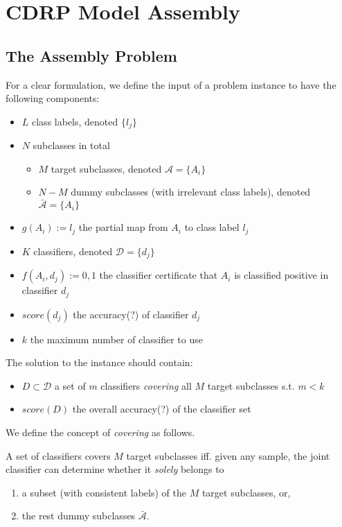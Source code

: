 \documentclass[sigplan,10pt,review]{acmart}\settopmatter{printfolios=true,printccs=false,printacmref=false}
\begin{document}
\section{CDRP Model Assembly}
\subsection{The Assembly Problem}
For a clear formulation, we define the input of a problem instance to have the following components:
\begin{itemize}
	\item $L$ class labels, denoted $\{l_j\}$
	\item $N$ subclasses in total \begin{itemize}
		\item $M$ target subclasses, denoted $\mathcal{A} = \{A_i\}$
		\item $N-M$ dummy subclasses (with irrelevant class labels), denoted $\bar{\mathcal{A}} = \{A_i\}$
	\end{itemize}
	\item $g(A_i) := l_j$ the partial map from $A_i$ to class label $l_j$
	\item $K$ classifiers, denoted $\mathcal{D} = \{d_j\}$
	\item $f(A_i, d_j) := 0, 1$ the classifier certificate that $A_i$ is classified positive in classifier $d_j$
	\item $score(d_j)$ the accuracy(?) of classifier $d_j$
	\item $k$ the maximum number of classifier to use
\end{itemize}

The solution to the instance should contain:
\begin{itemize}
	\item $D \subset \mathcal{D}$ a set of $m$ classifiers \textit{covering} all $M$ target subclasses s.t. $m < k$
	\item $score(D)$ the overall accuracy(?) of the classifier set
\end{itemize}

We define the concept of \textit{covering} as follows.
\begin{definition}
	A set of classifiers covers $M$ target subclasses iff. given any sample, the joint classifier can determine whether it \textit{solely} belongs to \begin{enumerate}
		\item a subset (with consistent labels) of the $M$ target subclasses, or,
		\item the rest dummy subclasses $\bar{\mathcal{A}}$.
	\end{enumerate}
\end{definition}
\end{document}
